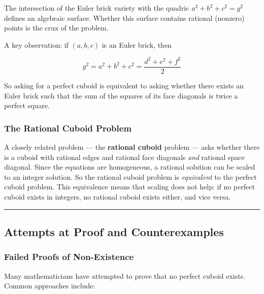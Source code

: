 \documentclass[10pt,a4paper]{article}
\begin{document}
The intersection of the Euler brick variety with the quadric $a^2 + b^2 + c^2 = g^2$ defines an algebraic surface. Whether this surface contains rational (nonzero) points is the crux of the problem.

A key observation: if $(a, b, c)$ is an Euler brick, then

\[g^2 = a^2 + b^2 + c^2 = \frac{d^2 + e^2 + f^2}{2}\]

So asking for a perfect cuboid is equivalent to asking whether there exists an Euler brick such that the sum of the squares of its face diagonals is twice a perfect square.

\subsubsection{The Rational Cuboid Problem}

A closely related problem --- the \textbf{rational cuboid} problem --- asks whether there is a cuboid with rational edges and rational face diagonals \emph{and} rational space diagonal. Since the equations are homogeneous, a rational solution can be scaled to an integer solution. So the rational cuboid problem is \emph{equivalent} to the perfect cuboid problem. This equivalence means that scaling does not help: if no perfect cuboid exists in integers, no rational cuboid exists either, and vice versa.

\begin{center}
\rule{0.5\textwidth}{0.4pt}
\end{center}

\subsection{Attempts at Proof and Counterexamples}

\subsubsection{Failed Proofs of Non-Existence}

Many mathematicians have attempted to prove that no perfect cuboid exists. Common approaches include:
\end{document}
